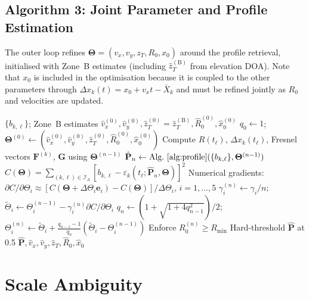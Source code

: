 \documentclass[11pt,a4paper]{article}
\begin{document}
\subsection{Algorithm 3: Joint Parameter and Profile Estimation}

The outer loop refines
$\bm{\Theta}=(v_x,v_y,z_T,R_0,x_0)$ around the profile retrieval,
initialised with Zone~B estimates (including
$\hat{z}_T^{(\mathrm{B})}$ from elevation DOA).  Note that $x_0$ is
included in the optimisation because it is coupled to the other
parameters through $\Delta x_k(t)=x_0+v_x t-\bar{X}_k$ and must be
refined jointly as $R_0$ and velocities are updated.

\begin{algorithm}[H]
\caption{Joint shadow profile and parameter estimation}
\label{alg:joint}
\begin{algorithmic}[1]
\Require $\{b_{k,\ell}\}$; Zone~B estimates
$\hat{v}_x^{(0)},\hat{v}_y^{(0)},
\hat{z}_T^{(0)}{=}\hat{z}_T^{(\mathrm{B})},
\hat{R}_0^{(0)},\hat{x}_0^{(0)}$
\State $q_0\leftarrow 1$;\;
$\bm{\Theta}^{(0)}\leftarrow
(\hat{v}_x^{(0)},\hat{v}_y^{(0)},\hat{z}_T^{(0)},
\hat{R}_0^{(0)},\hat{x}_0^{(0)})$
  \State Compute $R(t_\ell)$, $\Delta x_k(t_\ell)$, Fresnel vectors
    $\mathbf{F}^{(k)}$, $\mathbf{G}$ using $\bm{\Theta}^{(n-1)}$
  \State $\hat{\mathbf{P}}_n\leftarrow
    \text{Alg.~\ref{alg:profile}}
    (\{b_{k,\ell}\},\bm{\Theta}^{(n-1)})$
  \State $C(\bm{\Theta})
    =\sum_{(k,\ell)\in\mathcal{I}_A}[b_{k,\ell}
    -\varepsilon_k(t_\ell;\hat{\mathbf{P}}_n,\bm{\Theta})]^2$
  \State Numerical gradients:
    $\partial C/\partial\Theta_i\approx
    [C(\bm{\Theta}{+}\Delta\Theta_i\mathbf{e}_i)
    {-}C(\bm{\Theta})]/\Delta\Theta_i$,\;
    $i=1,\ldots,5$
  \State $\gamma_i^{(n)}\leftarrow\gamma_i/n$;\;
    $\tilde{\Theta}_i\leftarrow\Theta_i^{(n-1)}
    -\gamma_i^{(n)}\partial C/\partial\Theta_i$
  \State $q_n\leftarrow(1{+}\sqrt{1{+}4q_{n-1}^2})/2$;\;
    $\Theta_i^{(n)}\leftarrow\tilde{\Theta}_i
    +\tfrac{q_{n-1}{-}1}{q_n}
    (\tilde{\Theta}_i{-}\Theta_i^{(n-1)})$
  \State Enforce $R_0^{(n)}\ge R_{\min}$
\EndFor
\State Hard-threshold $\hat{\mathbf{P}}$ at 0.5
\State \Return
  $\hat{\mathbf{P}},\hat{v}_x,\hat{v}_y,\hat{z}_T,\hat{R}_0,\hat{x}_0$
\end{algorithmic}
\end{algorithm}

\section{Scale Ambiguity}
\label{sec:ambiguity}
\end{document}
